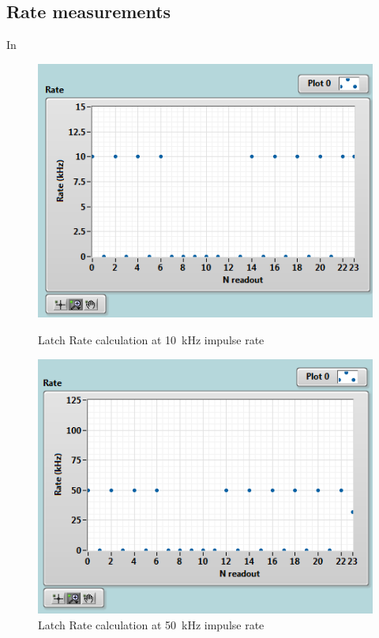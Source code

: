 \subsection{Rate measurements}
\noindent In  
\begin{figure}[H]
	\centering
	\begin{minipage}{0.49\textwidth}
		\centering
		\includegraphics[width=.95\linewidth]{IMG/ch5/latch_tests/fig3.PNG}
		\caption{Latch Rate calculation at 10~kHz impulse rate}
		\label{fig:latchrate10}
	\end{minipage}%
	\begin{minipage}{0.49\textwidth}
		\centering
		\includegraphics[width=.95\linewidth]{IMG/ch5/latch_tests/fig5.PNG}
		\caption{Latch Rate calculation at 50~kHz impulse rate}
		\label{fig:latchrate50}
	\end{minipage}
\end{figure}
